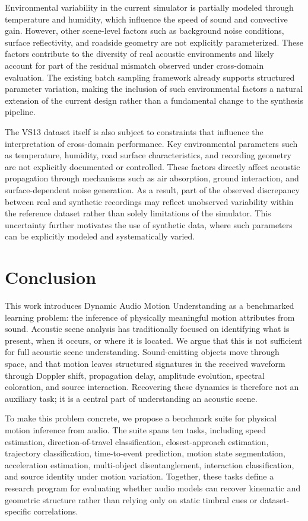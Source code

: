 \documentclass{article}
\begin{document}
Environmental variability in the current simulator is partially modeled through temperature and humidity, which influence the speed of sound and convective gain. However, other scene-level factors such as background noise conditions, surface reflectivity, and roadside geometry are not explicitly parameterized. These factors contribute to the diversity of real acoustic environments and likely account for part of the residual mismatch observed under cross-domain evaluation. The existing batch sampling framework already supports structured parameter variation, making the inclusion of such environmental factors a natural extension of the current design rather than a fundamental change to the synthesis pipeline.

The VS13 dataset itself is also subject to constraints that influence
the interpretation of cross-domain performance. Key environmental
parameters such as temperature, humidity, road surface characteristics,
and recording geometry are not explicitly documented or controlled.
These factors directly affect acoustic propagation through mechanisms
such as air absorption, ground interaction, and surface-dependent noise
generation. As a result, part of the observed discrepancy between real
and synthetic recordings may reflect unobserved variability within the
reference dataset rather than solely limitations of the simulator. This
uncertainty further motivates the use of synthetic data, where such
parameters can be explicitly modeled and systematically varied.
\section{Conclusion}

This work introduces Dynamic Audio Motion Understanding as a benchmarked learning problem: the inference of physically meaningful motion attributes from sound. Acoustic scene analysis has traditionally focused on identifying what is present, when it occurs, or where it is located. We argue that this is not sufficient for full acoustic scene understanding. Sound-emitting objects move through space, and that motion leaves structured signatures in the received waveform through Doppler shift, propagation delay, amplitude evolution, spectral coloration, and source interaction. Recovering these dynamics is therefore not an auxiliary task; it is a central part of understanding an acoustic scene.

To make this problem concrete, we propose a benchmark suite for physical motion inference from audio. The suite spans ten tasks, including speed estimation, direction-of-travel classification, closest-approach estimation, trajectory classification, time-to-event prediction, motion state segmentation, acceleration estimation, multi-object disentanglement, interaction classification, and source identity under motion variation. Together, these tasks define a research program for evaluating whether audio models can recover kinematic and geometric structure rather than relying only on static timbral cues or dataset-specific correlations.
\end{document}
